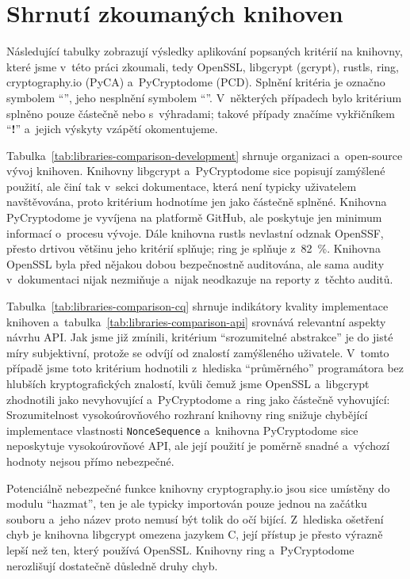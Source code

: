 \section{Shrnutí zkoumaných knihoven}

\newcommand{\yes}{\ding{51}}
\newcommand{\kinda}{\textbf{!}}
\newcommand{\no}{\ding{55}}

Následující tabulky zobrazují výsledky aplikování popsaných kritérií na knihovny, které jsme v~této práci zkoumali, tedy OpenSSL, libgcrypt (gcrypt), rustls, ring, cryptography.io (PyCA) a~PyCryptodome (PCD). Splnění kritéria je označno symbolem ``\yes'', jeho nesplnění symbolem ``\no''. V~některých případech bylo kritérium splněno pouze částečně nebo s~výhradami; takové případy značíme vykřičníkem ``\kinda'' a~jejich výskyty vzápětí okomentujeme.

Tabulka~\ref{tab:libraries-comparison-development} shrnuje organizaci a~open-source vývoj knihoven. Knihovny libgcrypt a~PyCryptodome sice popisují zamýšlené použití, ale činí tak v~sekci dokumentace, která není typicky uživatelem navštěvována, proto kritérium hodnotíme jen jako částečně splněné. Knihovna PyCryptodome je vyvíjena na platformě GitHub, ale poskytuje jen minimum informací o~procesu vývoje. Dále knihovna rustls nevlastní odznak OpenSSF, přesto drtivou většinu jeho kritérií splňuje; ring je splňuje z~82~\%. Knihovna OpenSSL byla před nějakou dobou bezpečnostně auditována, ale sama audity v~dokumentaci nijak nezmiňuje a~nijak neodkazuje na reporty z~těchto auditů.

Tabulka~\ref{tab:libraries-comparison-cq} shrnuje indikátory kvality implementace knihoven a~tabulka~\ref{tab:libraries-comparison-api} srovnává relevantní aspekty návrhu API. Jak jsme již zmínili, kritérium ``srozumitelné abstrakce'' je do jisté míry subjektivní, protože se odvíjí od znalostí zamýšleného uživatele. V~tomto případě jsme toto kritérium hodnotili z~hlediska ``průměrného'' programátora bez hlubších kryptografických znalostí, kvůli čemuž jsme OpenSSL a~libgcrypt zhodnotili jako nevyhovující a~PyCryptodome a~ring jako částečně vyhovující: Srozumitelnost vy\-so\-ko\-ú\-rov\-ňo\-vé\-ho rozhraní knihovny ring snižuje chybějící implementace vlastnosti \texttt{NonceSequence} a~knihovna PyCryptodome sice neposkytuje vysokoúrovňové API, ale její použití je poměrně snadné a~výchozí hodnoty nejsou přímo nebezpečné.

Potenciálně nebezpečné funkce knihovny cryptography.io jsou sice umístěny do modulu ``hazmat'', ten je ale typicky importován pouze jednou na začátku souboru a~jeho název proto nemusí být tolik do očí bijící. Z~hlediska ošetření chyb je knihovna libgcrypt omezena jazykem C, její přístup je přesto výrazně lepší než ten, který používá OpenSSL. Knihovny ring a~PyCryptodome nerozlišují dostatečně důsledně druhy chyb.

